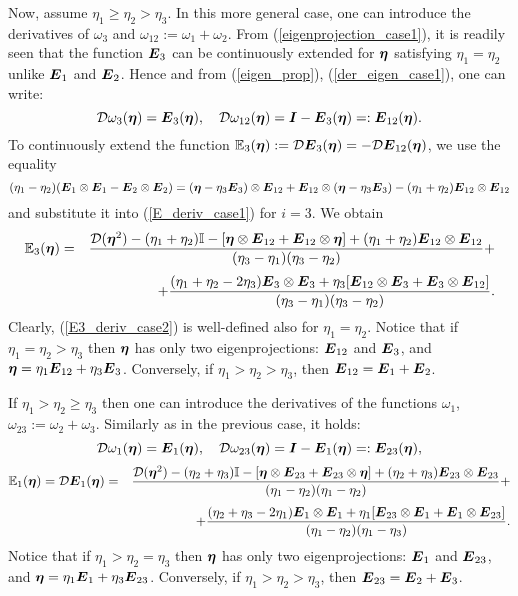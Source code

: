 \documentclass[a4paper,12pt]{article}
\theoremstyle{remark}
\newcommand{\mbf}[1]{\mbox{\boldmath$#1$}}
\numberwithin{equation}{section}
\begin{document}
Now, assume $\eta_1\geq\eta_2>\eta_3$. In this more general case, one can introduce the derivatives of $\omega_3$ and $\omega_{12}:=\omega_1+\omega_2$. From (\ref{eigenprojection_case1}), it is readily seen that the function $\mbf E_3$ can be continuously extended for $\mbf\eta$ satisfying $\eta_1=\eta_2$ unlike $\mbf E_1$ and $\mbf E_2$. Hence and from (\ref{eigen_prop}), (\ref{der_eigen_case1}), one can write:
\begin{equation}
\mathcal D\omega_3(\mbf\eta)=\mbf E_3(\mbf\eta),\quad \mathcal D\omega_{12}(\mbf\eta)=\mbf I-\mbf E_{3}(\mbf\eta)=: \mbf E_{12}(\mbf\eta).
\label{der_eigen_case2}
\end{equation}
To continuously extend the function $\mathbb E_3(\mbf\eta):=\mathcal D\mbf E_3(\mbf\eta)=-\mathcal D\mbf E_{12}(\mbf\eta)$, we use the equality
$$(\eta_1-\eta_2)(\mbf E_1\otimes\mbf E_1-\mbf E_2\otimes\mbf E_2)=(\mbf\eta-\eta_3\mbf E_3)\otimes\mbf E_{12}+\mbf E_{12}\otimes(\mbf\eta-\eta_3\mbf E_3)-(\eta_1+\eta_2)\mbf E_{12}\otimes\mbf E_{12}$$
and substitute it into (\ref{E_deriv_case1}) for $i=3$. We obtain
\begin{eqnarray}
\mathbb E_3(\mbf\eta)&=&\frac{\mathcal D(\mbf\eta^2)-(\eta_1+\eta_2)\mathbb I-[\mbf\eta\otimes\mbf E_{12}+\mbf E_{12}\otimes\mbf\eta]+(\eta_1+\eta_2)\mbf E_{12}\otimes\mbf E_{12}}{(\eta_3-\eta_1)(\eta_3-\eta_2)}+\nonumber\\[3pt]
&&+\frac{(\eta_1+\eta_2-2\eta_3)\mbf E_3\otimes\mbf E_3+\eta_3[\mbf E_{12}\otimes\mbf E_3+\mbf E_3\otimes\mbf E_{12}]}{(\eta_3-\eta_1)(\eta_3-\eta_2)}.
\label{E3_deriv_case2}
\end{eqnarray}
Clearly, (\ref{E3_deriv_case2}) is well-defined also for $\eta_1=\eta_2$. Notice that if $\eta_1=\eta_2>\eta_3$ then $\mbf \eta$ has only two eigenprojections: $\mbf E_{12}$ and $\mbf E_3$, and $\mbf\eta=\eta_1\mbf E_{12}+\eta_3\mbf E_{3}$. Conversely, if $\eta_1>\eta_2>\eta_3$, then $\mbf E_{12}=\mbf E_1+\mbf E_2$.

If $\eta_1> \eta_2\geq \eta_3$ then one can introduce the derivatives of the functions $\omega_1$, $\omega_{23}:=\omega_2+\omega_3$. Similarly as in the previous case, it holds:
\begin{equation}
\mathcal D\omega_1(\mbf\eta)=\mbf E_1(\mbf\eta),\quad \mathcal D\omega_{23}(\mbf\eta)=\mbf I-\mbf E_{1}(\mbf\eta)=: \mbf E_{23}(\mbf\eta),
\label{der_eigen_case3}
\end{equation}
\begin{eqnarray}
\mathbb E_1(\mbf\eta)=\mathcal D\mbf E_1(\mbf\eta)&=&\frac{\mathcal D(\mbf\eta^2)-(\eta_2+\eta_3)\mathbb I-[\mbf\eta\otimes\mbf E_{23}+\mbf E_{23}\otimes\mbf\eta]+(\eta_2+\eta_3)\mbf E_{23}\otimes\mbf E_{23}}{(\eta_1-\eta_2)(\eta_1-\eta_2)}+\nonumber\\[3pt]
&&+\frac{(\eta_2+\eta_3-2\eta_1)\mbf E_1\otimes\mbf E_1+\eta_1[\mbf E_{23}\otimes\mbf E_1+\mbf E_1\otimes\mbf E_{23}]}{(\eta_1-\eta_2)(\eta_1-\eta_3)}.
\label{E3_deriv_case3}
\end{eqnarray}
Notice that if $\eta_1>\eta_2=\eta_3$ then $\mbf \eta$ has only two eigenprojections: $\mbf E_{1}$ and $\mbf E_{23}$, and $\mbf\eta=\eta_1\mbf E_1+\eta_3\mbf E_{23}$. Conversely, if $\eta_1>\eta_2>\eta_3$, then $\mbf E_{23}=\mbf E_2+\mbf E_3$.
\end{document}
